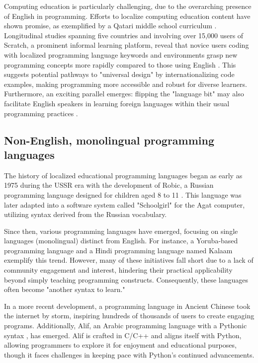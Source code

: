 \documentclass[conference]{IEEEtran}
\begin{document}
Computing education is particularly challenging, due to the overarching presence of English in programming. Efforts to localize computing education content have shown promise, as exemplified by a Qatari middle school curriculum \cite{localized_content}. Longitudinal studies spanning five countries and involving over 15,000 users of Scratch, a prominent informal learning platform, reveal that novice users coding with localized programming language keywords and environments grasp new programming concepts more rapidly compared to those using English \cite{dasgupta2017learning}. This suggests potential pathways to "universal design" \cite{universaldesign} by internationalizing code examples, making programming more accessible and robust for diverse learners. Furthermore, an exciting parallel emerges: flipping the "language bit" may also facilitate English speakers in learning foreign languages within their usual programming practices \cite{NonNative_English_Speakers}.


\subsection{Non-English, monolingual programming languages}

The history of localized educational programming languages began as early as 1975 during the USSR era with the development of Robic, a Russian programming language designed for children aged 8 to 11 \cite{Robik_Programming_Language}. This language was later adapted into a software system called "Schoolgirl" for the Agat computer, utilizing syntax derived from the Russian vocabulary.

Since then, various programming languages have emerged, focusing on single languages (monolingual) distinct from English. For instance, a Yoruba-based programming language \cite{african_native_language} and a Hindi programming language named Kalaam \cite{Kalam_Programming_Language} exemplify this trend. However, many of these initiatives fall short due to a lack of community engagement and interest, hindering their practical applicability beyond simply teaching programming constructs. Consequently, these languages often become "another syntax to learn."

In a more recent development, a programming language in Ancient Chinese \cite{wenyan_lang} took the internet by storm, inspiring hundreds of thousands of users to create engaging programs. Additionally, Alif, an Arabic programming language with a Pythonic syntax \cite{alif_language}, has emerged. Alif is crafted in C/C++ and aligns itself with Python, allowing programmers to explore it for enjoyment and educational purposes, though it faces challenges in keeping pace with Python's continued advancements.
\end{document}

